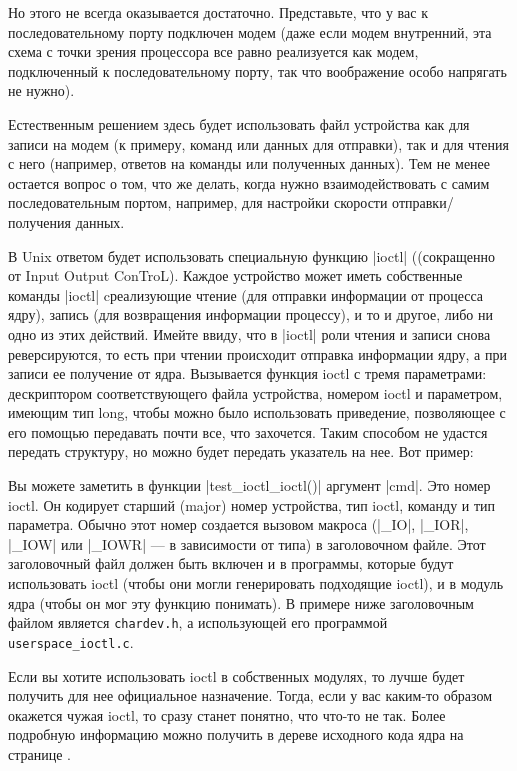 \documentclass[10pt, oneside]{book}
\begin{document}
Но этого не всегда оказывается достаточно. Представьте, что у вас к последовательному порту подключен модем (даже если модем внутренний, эта схема с точки зрения процессора все равно реализуется как модем, подключенный к последовательному порту, так что воображение особо напрягать не нужно).

Естественным решением здесь будет использовать файл устройства как для записи на модем (к примеру, команд или данных для отправки), так и для чтения с него (например, ответов на команды или полученных данных). Тем не менее остается вопрос о том, что же делать, когда нужно взаимодействовать с самим последовательным портом, например, для настройки скорости отправки/получения данных.

В Unix ответом будет использовать специальную функцию \cpp|ioctl| ((сокращенно от Input
Output ConTroL). Каждое устройство может иметь собственные команды \cpp|ioctl| cреализующие чтение (для отправки информации от процесса ядру), запись (для
возвращения информации процессу), и то и другое, либо ни одно из этих действий.
Имейте ввиду, что в \cpp|ioctl| роли чтения и записи снова реверсируются, то есть при чтении происходит отправка информации ядру, а при записи ее получение от ядра. Вызывается функция ioctl с тремя параметрами: дескриптором соответствующего файла устройства, номером ioctl и параметром, имеющим тип long, чтобы можно было использовать приведение, позволяющее с его помощью передавать почти все, что захочется.
Таким способом не удастся передать структуру, но можно будет передать указатель на нее. Вот пример:


Вы можете заметить в функции \cpp|test_ioctl_ioctl()| аргумент \cpp|cmd|.
Это номер ioctl.
Он кодирует старший (major) номер устройства, тип ioctl, команду и тип параметра. Обычно этот номер создается вызовом макроса (\cpp|_IO|, \cpp|_IOR|, \cpp|_IOW| или \cpp|_IOWR| — в зависимости от типа) в заголовочном файле.
Этот заголовочный файл должен быть включен и в программы, которые будут использовать ioctl (чтобы они могли генерировать подходящие ioctl), и в модуль ядра (чтобы он мог эту функцию понимать). В примере ниже заголовочным файлом является \verb|chardev.h|, а использующей его
программой \verb|userspace_ioctl.c|.

Если вы хотите использовать ioctl в собственных модулях, то лучше будет получить для нее официальное назначение. Тогда, если у вас каким-то образом окажется чужая ioctl, то сразу станет понятно, что что-то не так.
Более подробную информацию можно получить в дереве исходного кода ядра на странице .
\end{document}
